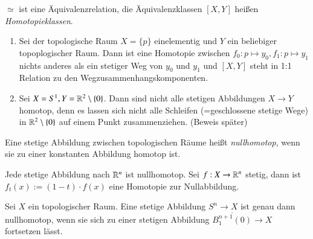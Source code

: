 \documentclass[a4paper,10pt]{scrartcl}
\begin{document}
$\simeq$ ist eine Äquivalenzrelation, die Äquivalenzklassen $[X,Y]$ heißen \emph{Homotopieklassen}.  
\begin{exs*}
 \begin{enumerate}
  \item Sei der topologische Raum $X=\{p\}$ einelementig und $Y$ ein beliebiger topoplogischer Raum.  Dann ist eine Homotopie zwischen $f_0: p\mapsto y_0, f_1: p\mapsto y_1$ nichts anderes als ein stetiger Weg von $y_0$ und $y_1$ und $[X,Y]$ steht in 1:1 Relation zu den Wegzusammenhangskomponenten.
  \item Sei $X=S^1, Y=\mathbb{R}^2\setminus \{0\}$. Dann sind nicht alle stetigen Abbildungen $X\to Y$ homotop, denn es lassen sich nicht alle Schleifen (=geschlossene stetige Wege) in $\mathbb{R}^2\setminus\{0\}$   auf einem Punkt zusammenziehen. (Beweis später)
\begin{figure}[H]
\centering
 \fixme[fig40]
\caption{}
\end{figure}
\end{enumerate}
\end{exs*}
\begin{df}
 Eine stetige Abbildung zwischen topologischen Räume heißt \emph{nullhomotop}, wenn sie zu einer konstanten Abbildung homotop ist. 
\end{df}
\begin{figure}[H]
\centering
 \fixme[fig41]
\caption{}
\end{figure}
\begin{ex*}
 Jede stetige Abbildung nach $\mathbb{R}^n$ ist nullhomotop. Sei $f: X\to \mathbb{R}^n$ stetig, dann ist $f_t(x):= (1-t)\cdot f(x)$ eine Homotopie zur Nullabbildung. 
\end{ex*}
\begin{st}
 Sei $X$ ein topologischer Raum.  Eine stetige Abbildung $S^n\to X$ ist genau dann nullhomotop, wenn sie sich zu einer stetigen Abbildung $\overline{B_1^{n+1}(0)}\to X$ fortsetzen lässt.
\end{st}
\end{document}

